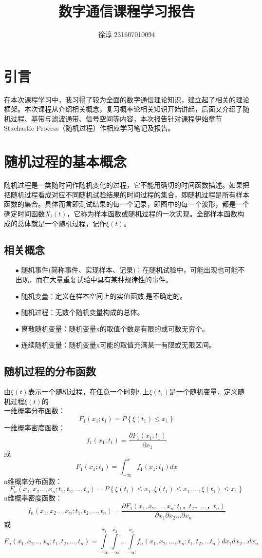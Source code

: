\documentclass[12pt,a4paper,oneside]{ctexart}
\title{\vspace{-4cm}\textbf{数字通信课程学习报告}}
\author{徐淳 231607010094}
\begin{document}
\maketitle
\section{引言}  
在本次课程学习中，我习得了较为全面的数字通信理论知识，建立起了相关的理论框架。本次课程从介绍相关概念，复习概率论相关知识开始讲起，后面又介绍了随机过程、基带与滤波通带、信号空间等内容，本次报告针对课程伊始章节Stachastic Process（随机过程）作相应学习笔记及报告。
\section{随机过程的基本概念}
随机过程是一类随时间作随机变化的过程，它不能用确切的时间函数描述。如果把把随机过程看成对应不同随机试验结果的时间过程的集合，即随机过程是所有样本函数的集合。具体而言即测试结果的每一个记录，即图中的每一个波形，都是一个确定时间函数$X_{i}(t)$，它称为样本函数或随机过程的一次实现。全部样本函数构成的总体就是一个随机过程，记作$\xi(t)$。
    \subsection{相关概念}
        \begin{itemize}
            \item[$\bullet$] 随机事件(简称事件、实现样本、记录)：在随机试验中，可能出现也可能不出现，而在大量重复试验中具有某种规律性的事件。
            \item[$\bullet$] 随机变量：定义在样本空间上的实值函数,是不确定的。
            \item[$\bullet$] 随机过程：无数个随机变量构成的总体。
            \item[$\bullet$] 离散随机变量：随机变量x的取值个数是有限的或可数无穷个。
            \item[$\bullet$] 连续随机变量：随机变量x可能的取值充满某一有限或无限区间。
        \end{itemize}
    \subsection{随机过程的分布函数}
    由$\xi(t)$表示一个随机过程，在任意一个时刻$t_{1}$上$\xi (t_{1})$是一个随机变量，定义随机过程$\xi(t)$的\\
    一维概率分布函数：
    $$
    F_{1} (x_{1};t_{1}) = P\left \{ \xi(t_{1})\le  x_{1} \right \}
    $$
    一维概率密度函数：
    $$
    f_{1} (x_{1};t_{1}) = \frac{\partial F_{1} (x_{1};t_{1})}{\partial x_{1}}
    $$
    或
    $$F_{1} (x_{1};t_{1}) = \int_{-\infty }^{x}  f_{1} (x_{1};t_{1})dx
    $$
    n维概率分布函数：
    $$
    F_{n} (x_{1},x_{2}...,x_{n};t_{1},t_{2},...,t_{n}) = P\left \{ \xi(t_{1})\le  x_{1} ,\xi(t_{1})\le  x_{1},...,\xi(t_{1})\le  x_{1}\right \}
    $$
    n维概率密度函数：
    $$
    f_{n} (x_{1},x_{2}...,x_{n};t_{1},t_{2},...,t_{n}) = \frac{\partial F_{1} (x_{1},x_{2},...,x_{n};t_{1}，t_{2}，...，t_{n})}{\partial x_{1}\partial x_{2}...\partial x_{n}}
    $$
    或
    $$
    F_{n} (x_{1},x_{2}...,x_{n};t_{1},t_{2},...,t_{n}) = \int\limits_{-\infty }^{x_{1}} \int\limits_{-\infty }^{x_{2}}...\int\limits_{-\infty }^{x_{n}}f_{n}(x_{1},x_{2},...,x_{n};t_{1},t_{2},...t_{n})dx_{1}dx_{2}...dx_{n}
    $$
\end{document}
